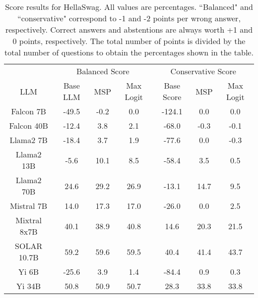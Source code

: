 \renewcommand\arraystretch{1.2}
\begin{table*}
\centering
\begin{tabular}{c|c|c|c|c|c|c}
& \multicolumn{3}{c|}{Balanced Score} & \multicolumn{3}{c}{Conservative Score} \\ 
LLM & Base LLM & MSP & Max Logit & Base Score & MSP & Max Logit\\ \hline
Falcon 7B & -49.5 & -0.2 & 0.0 & -124.1 & 0.0 & 0.0\\
Falcon 40B & -12.4 & 3.8 & 2.1 & -68.0 & -0.3 & -0.1\\
Llama2 7B & -18.4 & 3.7 & 1.9 & -77.6 & 0.0 & -0.3\\
Llama2 13B & -5.6 & 10.1 & 8.5 & -58.4 & 3.5 & 0.5\\
Llama2 70B & 24.6 & 29.2 & 26.9 & -13.1 & 14.7 & 9.5\\
Mistral 7B & 14.0 & 17.3 & 17.0 & -26.0 & 0.0 & 2.5\\
Mixtral 8x7B & 40.1 & 38.9 & 40.8 & 14.6 & 20.3 & 21.5\\
SOLAR 10.7B & 59.2 & 59.6 & 59.5 & 40.4 & 41.4 & 43.7\\
Yi 6B & -25.6 & 3.9 & 1.4 & -84.4 & 0.9 & 0.3\\
Yi 34B & 50.8 & 50.9 & 50.7 & 28.3 & 33.8 & 33.8\\
\hline
\end{tabular}
\caption{Score results for HellaSwag. All values are percentages. ``Balanced" and ``conservative" correspond to -1 and -2 points per wrong answer, respectively. Correct answers and abstentions are always worth +1 and 0 points, respectively. The total number of points is divided by the total number of questions to obtain the percentages shown in the table.}
\label{tab:hellaswag_score}
\end{table*}

